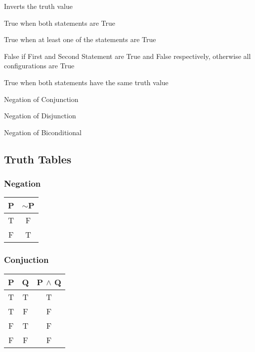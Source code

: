 \begin{multicols}{2}
\begin{description}[leftmargin=!,labelwidth=7em]
  \item[Negation] Inverts the truth value
  \item[Conjunction] True when both statements are True
  \item[Disjunction] True when at least one of the statements are True
  \item[Implication] False if First and Second Statement are True and False respectively, otherwise all configurations are True
  \item[Biconditional] True when both statements have the same truth value
  \item[NAND] Negation of Conjunction
  \item[NOR] Negation of Disjunction
  \item[XOR] Negation of Biconditional
\end{description}

\subsection{Truth Tables}

\subsubsection{Negation}

\begin{table}[H]
\centering
\begin{tabular}[t]{|c|c|}
\hline
\textbf{P} & \textbf{$\sim$P} \\ \hline
T & F \\ \hline
F & T \\ \hline
\end{tabular}
\end{table}

\subsubsection{Conjuction}

\begin{table}[H]
\centering
\begin{tabular}[t]{|c|c|c|}
\hline
\textbf{P} & \textbf{Q} & \textbf{P $\land$ Q} \\ \hline
T & T & T \\ \hline
T & F & F \\ \hline
F & T & F \\ \hline
F & F & F \\ \hline
\end{tabular}
\end{table}


\end{multicols}
